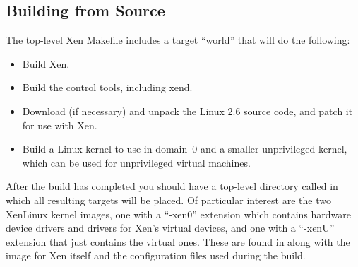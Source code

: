 \documentclass[11pt,twoside,final,openright]{report}
\def\xend{{xend}\xspace}
\begin{document}
%
%

\subsection{Building from Source}

The top-level Xen Makefile includes a target ``world'' that will do the
following:

\begin{itemize}
\item Build Xen.
\item Build the control tools, including \xend.
\item Download (if necessary) and unpack the Linux 2.6 source code, and
  patch it for use with Xen.
\item Build a Linux kernel to use in domain~0 and a smaller unprivileged
  kernel, which can be used for unprivileged virtual machines.
\end{itemize}

After the build has completed you should have a top-level directory
called  in which all resulting targets will be placed. Of
particular interest are the two XenLinux kernel images, one with a
``-xen0'' extension which contains hardware device drivers and drivers
for Xen's virtual devices, and one with a ``-xenU'' extension that
just contains the virtual ones. These are found in
 along with the image for Xen itself and the
configuration files used during the build.
\end{document}
